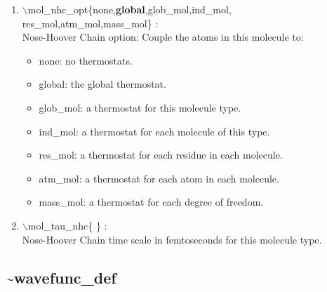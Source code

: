 \documentclass[12pt,titlepage]{article}
\begin{document}
\begin{enumerate}
 \vspace{0.15in} 
 \item  $\backslash$mol\_nhc\_opt\{none,{\bf global},glob\_mol,ind\_mol,\\ 
                 \hspace*{0.5in}res\_mol,atm\_mol,mass\_mol\} :  \\
   Nose-Hoover Chain option: Couple the atoms in this molecule to:
      \begin{itemize}
         \item none:     no thermostats.
         \item global:   the global thermostat.
         \item glob\_mol: a thermostat for this molecule type. 
         \item ind\_mol:  a thermostat for each molecule of this type. 
         \item res\_mol:  a thermostat for each residue in each molecule.
         \item atm\_mol:  a thermostat for each atom in each molecule.
         \item mass\_mol: a thermostat for each degree of freedom.
      \end{itemize}

 \vspace{0.15in} 
 \item  $\backslash$mol\_tau\_nhc\{ \} : \\
   Nose-Hoover Chain time scale in femtoseconds for this molecule type.

\end{enumerate}

\newpage
\subsection*{\bf \~{}wavefunc\_def}
\end{document}
